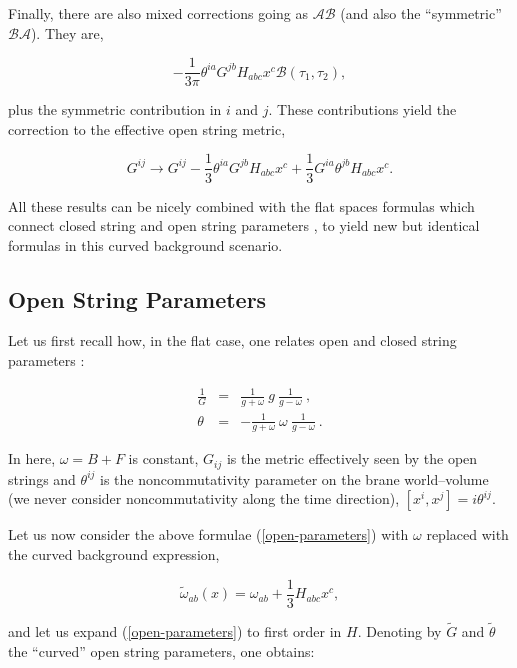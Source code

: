 \documentclass[a4paper,11pt]{article}
\newcommand{\notag}{\nonumber}
\begin{document}
\noindent 
Finally, there are also mixed corrections going as $\mathcal{A}\mathcal{B}
$ (and also the ``symmetric'' $\mathcal{B}\mathcal{A}$). They are,

$$
- {\frac{1 }{3\pi}} \theta^{ia} G^{jb} H_{abc} x^{c}
\mathcal{B} \left( \tau_{1},\tau_{2} \right),
$$

\noindent
plus the symmetric contribution in $i$ and $j$. These contributions yield
the correction to the effective open string metric,

\begin{equation}  \label{correction-metric}
G^{ij} \to G^{ij} - {\frac{1}{3}} \theta^{ia} G^{jb} H_{abc} x^{c} + 
{\frac{1}{3}} G^{ia} \theta^{jb} H_{abc} x^{c}.
\end{equation}

\noindent
All these results can be nicely combined with the flat spaces formulas
which connect closed string and open string parameters \cite{Schomerus,
Seiberg-Witten}, to yield new but identical formulas in this curved
background scenario.


\subsection{Open String Parameters}


Let us first recall how, in the flat case, one relates open and closed
string parameters \cite{Schomerus,Seiberg-Witten}:

\begin{eqnarray}  \label{open-parameters}
\frac{1}{G} &=& {\frac{1}{g+\omega}}\ g\ {\frac{1}{g-\omega}}\ ,  \notag \\
\theta &=& - {\frac{1}{g+\omega}}\ \omega\ {\frac{1}{g-\omega}}\ .
\end{eqnarray}

\noindent
In here, $\omega = B + F$ is constant, $G_{ij}$ is the metric
effectively seen by the open strings and $\theta^{ij}$
is the noncommutativity parameter on the brane world--volume (we never
consider noncommutativity along the time direction), $[x^{i}, x^{j}] =
i\theta^{ij}$.

Let us now consider the above formulae (\ref{open-parameters}) with
$\omega$ replaced with the curved background expression,

$$
\widetilde{\omega}_{ab} (x) = \omega_{ab} + {\frac{1}{3}} H_{abc} x^{c},
$$

\noindent 
and let us expand  (\ref{open-parameters}) to first order in
$H$. Denoting by $\widetilde{G}$ and $\widetilde{\theta}$
the ``curved'' open string parameters, one obtains:
\end{document}

